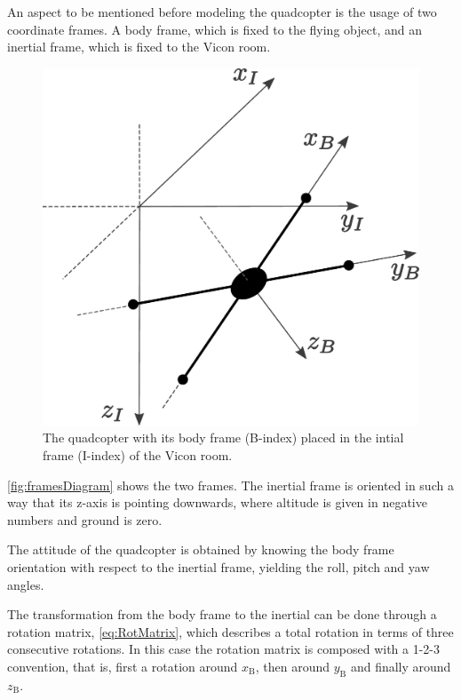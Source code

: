 An aspect to be mentioned before modeling the quadcopter is the usage of two coordinate frames. A body frame, which is fixed to the flying object, and an inertial frame, which is fixed to the Vicon room. 
%
\begin{figure}[H]
    \centering
    \includegraphics[scale=0.25]{figures/framesDiagram}
    \caption{The quadcopter with its body frame (B-index) placed in the intial frame (I-index) of the Vicon room. }
    \label{fig:framesDiagram}
\end{figure}

\autoref{fig:framesDiagram} shows the two frames. The inertial frame is oriented in such a way that its z-axis is pointing downwards, where altitude is given in negative numbers and ground is zero.

The attitude of the quadcopter is obtained by knowing the body frame orientation with respect to the inertial frame, yielding the roll, pitch and yaw angles. 

The transformation from the body frame to the inertial can be done through a rotation matrix, \autoref{eq:RotMatrix}, which describes a total rotation in terms of three consecutive rotations. In this case the rotation matrix is composed with a 1-2-3 convention, that is, first a rotation around $x_{\mathrm{B}}$, then around $y_{\mathrm{B}}$ and finally around $z_{\mathrm{B}}$. \cite{rotationmatrix}

